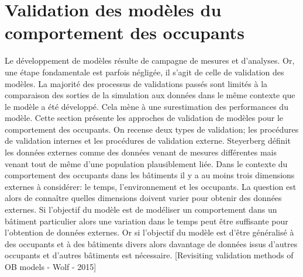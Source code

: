 \section{Validation des modèles du comportement des occupants}

Le développement de modèles résulte de campagne de mesures et d'analyses. Or, une étape fondamentale est parfois négligée, il s'agit de celle de validation des modèles. La majorité des processus de validations passés sont limités à la comparaison des sorties de la simulation aux données dans le même contexte que le modèle a été développé. Cela mène à une surestimation des performances du modèle. Cette section présente les approches de validation de modèles pour le comportement des occupants.
On recense deux types de validation; les procédures de validation internes et les procédures de validation externe. Steyerberg \cite{Steyerberg-03} définit les données externes comme des données venant de mesures différentes mais venant tout de même d'une population plausiblement liée.
Dans le contexte du comportement des occupants dans les bâtiments il y a au moins trois dimensions externes à considérer: le temps, l'environnement et les occupants. La question est alors de connaître quelles dimensions doivent varier pour obtenir des données externes. Si l'objectif du modèle est de modéliser un comportement dans un bâtiment particulier alors une variation dans le temps peut être suffisante pour l'obtention de données externes. Or si l'objectif du modèle est d'être généralisé à des occupants et à des bâtiments divers alors davantage de données issus d'autres occupants et d'autres bâtiments est nécessaire.
[Revisiting validation methods of OB models - Wolf - 2015]





